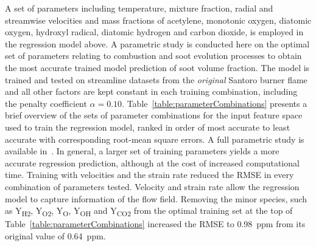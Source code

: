 \documentclass[12pt]{CHT-20}
\begin{document}
A set of parameters including temperature, mixture fraction, radial and streamwise velocities and mass fractions of acetylene, monotonic oxygen, diatomic oxygen, hydroxyl radical, diatomic hydrogen and carbon dioxide, is employed in the regression model above. A parametric study is conducted here on the optimal set of parameters relating to combustion and soot evolution processes to obtain the most accurate trained model prediction of soot volume fraction. The model is trained and tested on streamline datasets from the \emph{original} Santoro burner flame and all other factors are kept constant in each training combination, including the penalty coefficient $\alpha=0.10$. Table~\ref{table:parameterCombinations} presents a brief overview of the sets of parameter combinations for the input feature space used to train the regression model, ranked in order of most accurate to least accurate with corresponding root-mean square errors. A full parametric study is available in~\citep[]{Squeo2021}. In general, a larger set of training parameters yields a more accurate regression prediction, although at the cost of increased computational time. Training with velocities and the strain rate reduced the RMSE in every combination of parameters tested. Velocity and strain rate allow the regression model to capture information of the flow field. Removing the minor species, such as Y\textsubscript{H2}, Y\textsubscript{O2}, Y\textsubscript{O}, Y\textsubscript{OH} and Y\textsubscript{CO2} from the optimal training set at the top of Table~\ref{table:parameterCombinations} increased the RMSE to 0.98~ppm from its original value of 0.64~ppm. 
\end{document}
